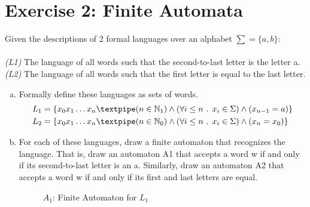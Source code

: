 \documentclass{article}
\newcommand{\N}{\mathbb{N}}
\begin{document}
\newpage
\section*{Exercise 2: Finite Automata}

Given the descriptions of 2 formal languages over an alphabet $\sum=\{a,b\}$: \\\\
\textit{(L1)} The language of all words such that the second-to-last letter is the letter a.\\
\textit{(L2)} The language of all words such that the first letter is equal to the last letter.


\begin{enumerate}[(a)]
    \item {Formally define these languages as sets of words.}
    \begin{equation}
        \begin{split}
            L_1 &= \{x_0x_1\dotsc x_n \textpipe  ( n \in \N_1 ) \wedge (\forall i \leq n \text{ . } x_i \in \Sigma) \wedge (x_{n-1} = a)\} \\
            L_2 &= \{x_0x_1\dotsc x_n \textpipe  ( n \in \N_0 ) \wedge (\forall i \leq n \text{ . } x_i \in \Sigma) \wedge (x_{n} = x_0)\}
        \end{split}
    \end{equation}
    
    \item {For each of these languages, draw a finite automaton that recognizes the language.
That is, draw an automaton A1 that accepts a word w if and only if its second-to-last letter is an a. Similarly, draw an automaton A2 that accepts a word w if and
only if its first and last letters are equal.}
    \begin{figure}[ht] %
        \centering %
        \caption{$A_1$: Finite Automaton for $L_1$ }
        \label{fig:state-machine-l1}
    \end{figure}
    

\end{enumerate}
\end{document}
